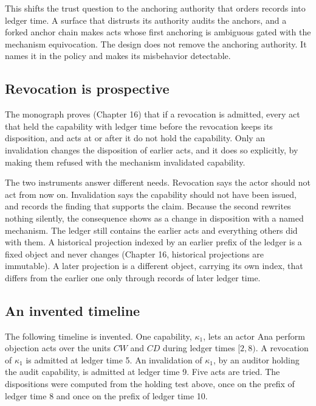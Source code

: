 \documentclass[11pt]{article}
\begin{document}
This shifts the trust question to the anchoring authority that orders records into ledger time. A surface that distrusts its authority audits the anchors, and a forked anchor chain makes acts whose first anchoring is ambiguous gated with the mechanism \textsf{equivocation}. The design does not remove the anchoring authority. It names it in the policy and makes its misbehavior detectable.

\subsection{Revocation is prospective}

The monograph proves (Chapter 16) that if a revocation is admitted, every act that held the capability with ledger time before the revocation keeps its disposition, and acts at or after it do not hold the capability. Only an invalidation changes the disposition of earlier acts, and it does so explicitly, by making them refused with the mechanism \textsf{invalidated capability}.

The two instruments answer different needs. Revocation says the actor should not act from now on. Invalidation says the capability should not have been issued, and records the finding that supports the claim. Because the second rewrites nothing silently, the consequence shows as a change in disposition with a named mechanism. The ledger still contains the earlier acts and everything others did with them. A historical projection indexed by an earlier prefix of the ledger is a fixed object and never changes (Chapter 16, historical projections are immutable). A later projection is a different object, carrying its own index, that differs from the earlier one only through records of later ledger time.

\subsection{An invented timeline}

The following timeline is invented. One capability, $\kappa_1$, lets an actor Ana perform objection acts over the units $CW$ and $CD$ during ledger times $[2,8)$. A revocation of $\kappa_1$ is admitted at ledger time 5. An invalidation of $\kappa_1$, by an auditor holding the audit capability, is admitted at ledger time 9. Five acts are tried. The dispositions were computed from the holding test above, once on the prefix of ledger time 8 and once on the prefix of ledger time 10.
\end{document}

